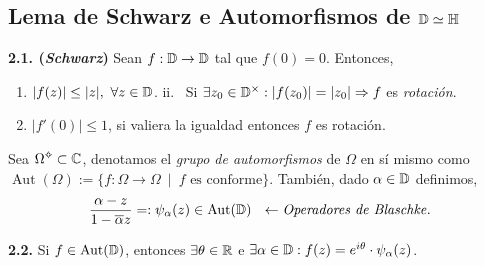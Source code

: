 \subsection*{Lema de Schwarz e Automorfismos de \(\mathbb{D}\simeq \mathbb{H}\)}

\begin{lemma}
    \textbf{2.1. (\emph{Schwarz})} Sean \(f: \mathbb{D} \to \mathbb{D} \) tal que \(f(0) = 0 \). Entonces, 
    \vspace{-0.3cm}
    \begin{enumerate}[label = \roman*., left = 0.2cm ]
        \item \(|f(z)| \leq |z|, \ \forall z \in \mathbb{D} \). \hfill ii. \ Si \(\exists z_0 \in \mathbb{D}^\times : |f(z_0)| = |z_0| \Rightarrow f\) es \emph{rotación}. 
        \item[iii.] \(|f'(0)| \leq 1\), si valiera la igualdad entonces \(f\) es rotación.
    \end{enumerate}
\end{lemma}


\begin{definition}
    Sea \(\Omega\ab\subset \C\), denotamos el \emph{grupo de automorfismos} de \(\Omega\) en sí mismo como \(\operatorname{Aut}(\Omega):= \{f: \Omega \to \Omega \ \mid \ f \text{ es conforme}\}\). También, dado \(\alpha \in \mathbb{D}\) definimos, 
    \[\frac{\alpha - z}{1 - \overline{\alpha} z} =: \psi_\alpha(z) \in \operatorname{Aut}(\D)\ \  \leftarrow  \text{\emph{Operadores de Blaschke}}. \]  
\end{definition}

\begin{theorem}
    \textbf{2.2.} Si \(f \in \operatorname{Aut}(\mathbb{D})\), entonces \(\exists \theta \in \mathbb{R}\) e \(\exists \alpha \in \mathbb{D}  : f(z) = e^{i\theta}\cdot \psi_\alpha(z)\).
\end{theorem}


